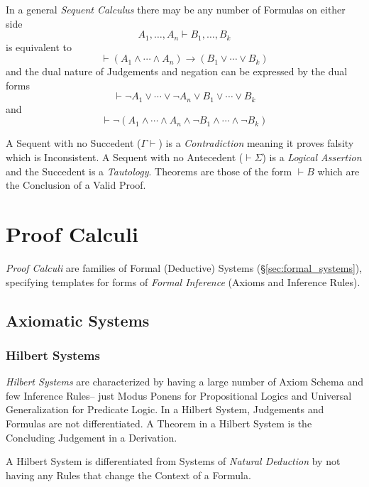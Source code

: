 \documentclass{article}
\begin{document}
In a general \emph{Sequent Calculus} there may be any
number of Formulas on either side
\[
    A_1, \ldots, A_n \vdash B_1, \ldots, B_k
\]
is equivalent to
\[
    \vdash(A_1 \wedge \cdots \wedge A_n) \rightarrow (B_1 \vee \cdots \vee B_k)
\]
and the dual nature of Judgements and negation can be expressed by the
dual forms
\[
    \vdash \neg A_1 \vee \cdots \vee \neg A_n \vee B_1 \vee \cdots
    \vee B_k
\]
and
\[
    \vdash \neg(A_1 \wedge \cdots \wedge A_n \wedge \neg B_1 \wedge
    \cdots \wedge \neg B_k)
\]

A Sequent with no Succedent ($\Gamma \vdash$) is a
\emph{Contradiction} meaning it proves falsity which is
Inconsistent. A Sequent with no Antecedent ($\vdash \Sigma$) is a
\emph{Logical Assertion} and the Succedent is a
\emph{Tautology}. Theorems are those of the form $\vdash B$ which are
the Conclusion of a Valid Proof.

\section{Proof Calculi}

\emph{Proof Calculi} are families of Formal (Deductive) Systems
(\S\ref{sec:formal_systems}), specifying templates for forms of
\emph{Formal Inference} (Axioms and Inference Rules).

\subsection{Axiomatic Systems}

\subsubsection{Hilbert Systems} \label{subsec:hilbert_systems}

\emph{Hilbert Systems} are characterized by having a large number of
Axiom Schema and few Inference Rules-- just Modus Ponens for
Propositional Logics and Universal Generalization for Predicate
Logic. In a Hilbert System, Judgements and Formulas are not
differentiated. A Theorem in a Hilbert System is the Concluding
Judgement in a Derivation.

A Hilbert System is differentiated from Systems of \emph{Natural
 Deduction} by not having any Rules that change the Context of a
Formula.
\end{document}
